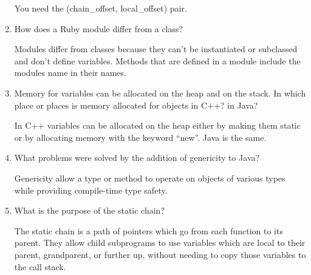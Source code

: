 \begin{enumerate}
 \begin{answer}

    You need the (chain\_offset, local\_offset) pair.

    \end{answer}

  \item How does a Ruby module differ from a class?

 \begin{answer}

    Modules differ from classes because they can't be instantiated or subclassed
and don't define variables.  Methods that are defined in a module include the
modules name in their names.

    \end{answer}

  \item Memory for variables can be allocated on the heap
    and on the stack. In which place or places is memory
    allocated for objects in C++? in Java?

 \begin{answer}

    In C++ variables can be allocated on the heap either by making them static
or by allocating memory with the keyword ``new''.  Java is the same.

    \end{answer}

  \item What problems were solved by the addition
    of genericity to Java?

 \begin{answer}

    Genericity allow a type or method to operate on objects of various types
while providing compile-time type safety.

    \end{answer}

  \item What is the purpose of the static chain?

 \begin{answer}

    The static chain is a path of pointers which go from each function to its
parent. They allow child subprograms to use variables which are local to their
parent, grandparent, or further up, without needing to copy those variables to the
call stack.

    \end{answer}


\end{enumerate}
